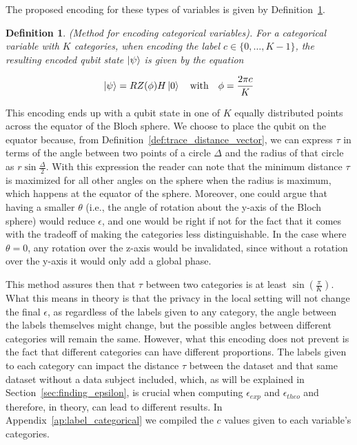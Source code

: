 \documentclass{ieeeaccess}
\newtheorem{definition}{Definition}[section]
\begin{document}
The proposed encoding for these types of variables is given by Definition~\ref{def:encoding_categorical}.

\begin{definition}
  (Method for encoding categorical variables). For a categorical variable with $K$ categories, when encoding the label $c \in \{0, \dots, K - 1\}$, the resulting encoded qubit state $\ket{\psi}$ is given by the equation

  \[
    \ket{\psi} = RZ(\phi)H\ket{0} \quad \text{with} \quad \phi = \frac{2\pi c}{K}
  \]
  \label{def:encoding_categorical}
\end{definition}


This encoding ends up with a qubit state in one of $K$ equally distributed points across the equator of the Bloch sphere. We choose to place the qubit on the equator because, from Definition~\ref{def:trace_distance_vector}, we can express $\tau$ in terms of the angle between two points of a circle $\Delta$ and the radius of that circle as $r\sin{\frac{\Delta}{2}}$. With this expression the reader can note that the minimum distance $\tau$ is maximized for all other angles on the sphere when the radius is maximum, which happens at the equator of the sphere. Moreover, one could argue that having a smaller $\theta$ (i.e., the angle of rotation about the y-axis of the Bloch sphere) would reduce $\epsilon$, and one would be right if not for the fact that it comes with the tradeoff of making the categories less distinguishable. In the case where $\theta = 0$, any rotation over the z-axis would be invalidated, since without a rotation over the y-axis it would only add a global phase.

This method assures then that $\tau$ between two categories is at least $\sin(\frac{\pi}{K})$. What this means in theory is that the privacy in the local setting will not change the final $\epsilon$, as regardless of the labels given to any category, the angle between the labels themselves might change, but the possible angles between different categories will remain the same. However, what this encoding does not prevent is the fact that different categories can have different proportions. The labels given to each category can impact the distance $\tau$ between the dataset and that same dataset without a data subject included, which, as will be explained in Section~\ref{sec:finding_epsilon}, is crucial when computing $\epsilon_{exp}$ and $\epsilon_{theo}$ and therefore, in theory, can lead to different results. In Appendix~\ref{ap:label_categorical} we compiled the $c$ values given to each variable's categories.
\end{document}
